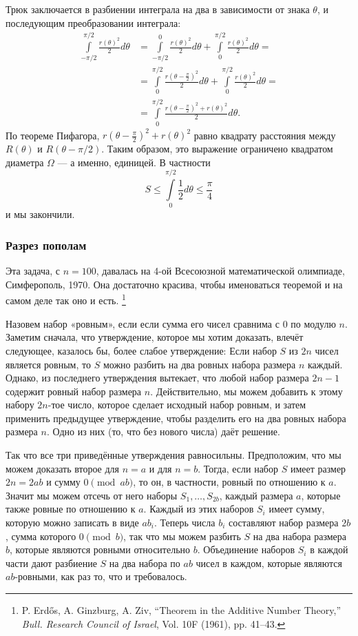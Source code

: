 Трюк заключается в разбиении интеграла на два в зависимости от знака $\theta$, и последующим преобразовании интеграла:
\begin{align*}
\int\limits_{-\pi/2}^{\pi/2}\frac{r(\theta)^2}{2}d\theta&=\int\limits_{-\pi/2}^{0}\frac{r(\theta)^2}{2}d\theta+\int\limits_{0}^{\pi/2}\frac{r(\theta)^2}{2}d\theta=
\\
&=\int\limits_{0}^{\pi/2}\frac{r(\theta-\tfrac\pi2)^2}{2}d\theta+\int\limits_{0}^{\pi/2}\frac{r(\theta)^2}{2}d\theta=
\\
&=\int\limits_{0}^{\pi/2}\frac{r(\theta-\tfrac\pi2)^2+r(\theta)^2}{2}d\theta.
\end{align*}
По теореме Пифагора, $r(\theta-\tfrac\pi2)^2+r(\theta)^2$ равно квадрату расстояния между $R(\theta)$ и $R(\theta- \pi/2)$.
Таким образом, это выражение ограничено квадратом диаметра $\Omega$ --- а именно, единицей.
В частности
\[S\le \int\limits_{0}^{\pi/2}\frac12d\theta\le\frac\pi4\]
и мы закончили.
\heart

\subsubsection*{Разрез пополам}

Эта задача, с $n=100$, давалась на 4-ой Всесоюзной математической олимпиаде, Симферополь, 1970.
Она достаточно красива, чтобы именоваться теоремой и на самом деле так оно и есть.%
\footnote{P. Erd\H{o}s, A. Ginzburg, A. Ziv, ``Theorem in the Additive Number Theory,'' \emph{Bull. Research Council of Israel}, Vol. 10F (1961), pp. 41--43.}

Назовем набор «ровным», если если сумма его чисел сравнима с $0$ по модулю $n$.
Заметим сначала, что утверждение, которое мы хотим доказать, влечёт следующее, казалось бы, более слабое утверждение: 
Если набор $S$ из $2n$ чисел является ровным, то $S$ можно разбить на два ровных набора размера $n$ каждый.
Однако, из последнего утверждения вытекает, что любой набор размера $2n-1$ содержит ровный набор размера $n$.
Действительно, мы можем добавить к этому набору $2n$-тое число, которое сделает исходный набор ровным, и затем применить предыдущее утверждение, чтобы разделить его на два ровных набора размера $n$. 
Одно из них (то, что без нового числа) даёт решение.

Так что все три приведённые утверждения равносильны.
Предположим, что мы можем доказать второе для $n = a$ и для $n = b$.
Тогда, если набор $S$ имеет размер $2n = 2ab$ и сумму $0 \pmod {ab}$, то он, в частности, ровный по отношению к $a$. 
Значит мы можем отсечь от него наборы $S_1,\dots,S_{2b}$, каждый размера $a$, которые также ровные по отношению к $a$.
Каждый из этих наборов $S_i$ имеет сумму, которую можно записать в виде $ab_i$.
Теперь числа $b_i$ составляют набор размера $2b$, сумма которого $0 \pmod b$, так что мы можем разбить $S$ на два набора размера $b$, которые являются ровными относительно $b$.
Объединение наборов $S_i$ в каждой части дают разбиение $S$ на два набора по $ab$ чисел в каждом, которые являются $ab$-ровными, как раз то, что и требовалось.

